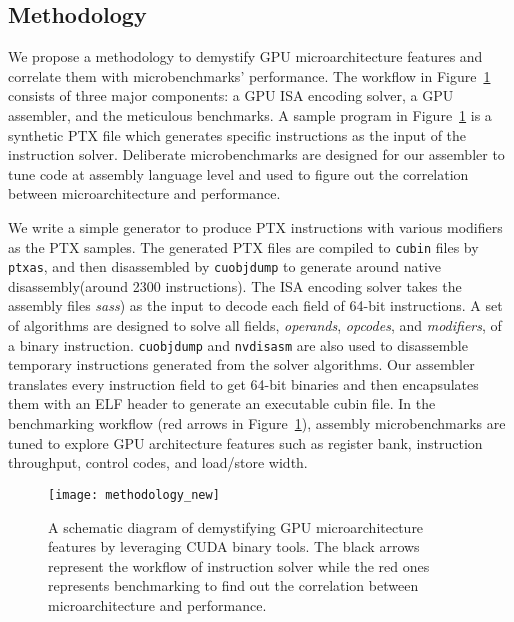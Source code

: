 \subsection{Methodology}


We propose a methodology to demystify GPU microarchitecture features and correlate them with microbenchmarks' performance.
The workflow in Figure~\ref{fig:workflow} consists of three major components: a GPU ISA encoding solver, a GPU assembler, and the meticulous benchmarks.
A sample program in Figure~\ref{fig:workflow} is a synthetic PTX file which generates specific instructions as the input of the instruction solver.
Deliberate microbenchmarks are designed for our assembler to tune code at assembly language level and used to figure out the correlation between microarchitecture and performance.

We write a simple generator to produce PTX instructions with various modifiers as the PTX samples.
The generated PTX files are compiled to {\tt cubin} files by {\tt ptxas}, and
then disassembled by {\tt cuobjdump} to generate around native disassembly(around 2300 instructions). 
The ISA encoding solver takes the assembly files {\em sass}) as the input to decode each field of 64-bit instructions.
A set of algorithms are designed to solve all fields, {\em operands}, {\em opcodes}, and {\em modifiers}, of a binary instruction.
{\tt cuobjdump} and {\tt nvdisasm} are also used to disassemble temporary instructions generated from the solver algorithms.
Our assembler translates every instruction field to get 64-bit binaries and then encapsulates them with an ELF header to generate an executable cubin file.
In the benchmarking workflow (red arrows in Figure~\ref{fig:workflow}), assembly microbenchmarks are tuned to explore GPU architecture features such as register bank, instruction throughput, control codes, and load/store width.


\begin{figure}[htbp]
\begin{center}
    \texttt{[image: methodology\_new]}
\caption{A schematic diagram of demystifying GPU microarchitecture features by leveraging CUDA binary tools. The black arrows
    represent the workflow of instruction solver while the red ones represents benchmarking to find out the correlation between microarchitecture and performance.}
\label{fig:workflow}
\end{center}
\end{figure}
